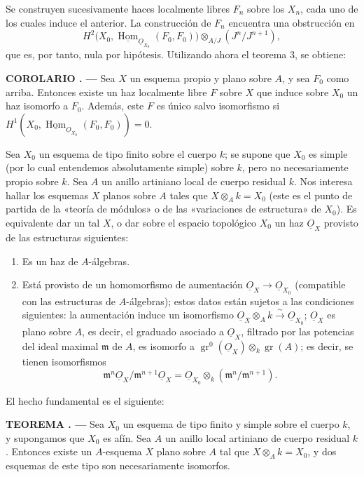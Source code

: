\documentclass[11pt,twoside,openany]{book}
\numberwithin{equation}{section}
\newcommand{\src}[1]{%
  \phantomsection\hypertarget{src:#1}{}%
  \marginpar{\raggedleft\footnotesize\sffamily #1}%
}
\newcommand{\Osh}{\underline{O}}
\newcommand{\Homsh}{\underline{\operatorname{Hom}}}
\theoremstyle{plain}
\theoremstyle{definition}
\theoremstyle{remark}
\newcommand{\result}[2]{%
  \par\medskip\noindent\textbf{#1%
  \if\relax\detokenize{#2}\relax\else\space#2\fi. ---}\enspace
}
\newcommand{\FgaUnitKey}{frontmatter}
\renewcommand{\src}[1]{%
  \phantomsection\hypertarget{src:\FgaUnitKey:#1}{}%
  \marginpar{\raggedleft\footnotesize\sffamily #1}%
}
\theoremstyle{plain}
\theoremstyle{definition}
\theoremstyle{remark}
\begin{document}
Se construyen sucesivamente haces localmente libres $F_n$ sobre los $X_n$, cada
uno de los cuales induce el anterior. La construcción de $F_n$ encuentra una
obstrucción en
\[
  H^2\bigl(X_0,\Homsh_{\Osh_{X_0}}(F_0,F_0)\bigr)
  \otimes_{A/J}(J^n/J^{n+1}),
\]
que es, por tanto, nula por hipótesis. Utilizando ahora el teorema 3, se
obtiene:

\result{COROLARIO}{1} Sea $X$ un esquema propio y plano sobre $A$, y sea $F_0$
como arriba. Entonces existe un haz localmente libre $F$ sobre $X$ que induce
sobre $X_0$ un haz isomorfo a $F_0$. Además, este $F$ es único salvo
isomorfismo si
$H^1(X_0,\Homsh_{\Osh_{X_0}}(F_0,F_0))=0$.

Sea $X_0$ un esquema de tipo finito sobre el cuerpo $k$; se supone que $X_0$ es
simple (por lo cual entendemos absolutamente simple) sobre $k$, pero no
necesariamente propio sobre $k$. Sea $A$ un anillo artiniano local de cuerpo
residual $k$. Nos interesa hallar los esquemas $X$ planos sobre $A$ tales que
$X\otimes_A k=X_0$ (este es el punto de partida de la «teoría de módulos» o de
las «variaciones de estructura» de $X_0$). Es equivalente dar un tal $X$, o dar
sobre el espacio topológico $X_0$ un haz $\Osh_X$ provisto de las estructuras
siguientes:
\begin{enumerate}
  \item[\textit{i.}] Es un haz de $A$-álgebras.
  \item[\textit{ii.}] Está provisto de un homomorfismo de aumentación
    $\Osh_X\longrightarrow\Osh_{X_0}$ (compatible con las estructuras de
    $A$-álgebras); estos datos están sujetos a las condiciones siguientes: la
    aumentación induce un isomorfismo
    $\Osh_X\otimes_A k\xrightarrow{\sim}\Osh_{X_0}$; $\Osh_X$ es plano sobre
    $A$, es decir, el graduado asociado a $\Osh_X$, filtrado por las potencias
    del ideal maximal $\mathfrak m$ de $A$, es isomorfo a
    $\operatorname{gr}^0(\Osh_X)\otimes_k\operatorname{gr}(A)$; es decir, se
    tienen isomorfismos
    \[
      \mathfrak m^n\Osh_X/\mathfrak m^{n+1}\Osh_X
      =\Osh_{X_0}\otimes_k(\mathfrak m^n/\mathfrak m^{n+1}).
    \]
\end{enumerate}
El hecho fundamental es el siguiente:

\src{204}
\result{TEOREMA}{8} Sea $X_0$ un esquema de tipo finito y simple sobre el
cuerpo $k$, y supongamos que $X_0$ es afín. Sea $A$ un anillo local artiniano de
cuerpo residual $k$. Entonces existe un $A$-esquema $X$ plano sobre $A$ tal que
$X\otimes_A k=X_0$, y dos esquemas de este tipo son necesariamente isomorfos.
\end{document}
